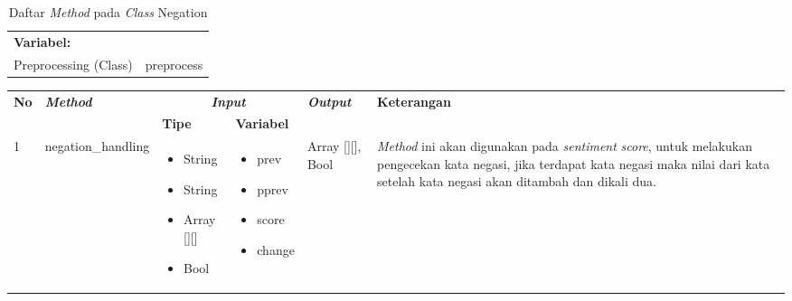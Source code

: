 \begin{table}[H]
	\caption{Daftar \textit{Method} pada \textit{Class} Negation}
	\centering
	\small
	\begin{adjustbox}{width=1\textwidth}	
	\begin{tabular}{|p{4cm} p{9cm}|}
		\hline
		\multicolumn{2}{|l|}{\textbf{Variabel:}}\\
		Preprocessing (Class)&preprocess\\
		\hline
	\end{tabular}
	\end{adjustbox}
\end{table}
\begin{table}[H]
	\centering
	\small
	\begin{adjustbox}{width=1\textwidth}	
	\begin{tabular}{|p{0.4cm}|p{3.2cm}|p{1.4cm}|p{1.7cm}|p{1.20cm}|p{3.35cm}|}
		\hline
		\multirow{2}{*}{\textbf{No}} & \multirow{2}{*}{\textit{\textbf{Method}}} & \multicolumn{2}{c|}{\textit{\textbf{Input}}} & \multirow{2}{*}{\textit{\textbf{Output}}} & 
		\multirow{2}{*}{\textbf{Keterangan}}\\
		\cline{3-4}
		& & \textbf{Tipe} & \textbf{Variabel} & & \\
		\hline
		1 & negation\_handling & \begin{itemize}[leftmargin=*,label={-}]
			\item String
			\item String
			\item Array [][]
			\item Bool\end{itemize}
		& \begin{itemize}[leftmargin=*,label={-}]
			\vspace{-0.5cm}
			\item prev
			\item pprev
			\item score
			\item change\end{itemize}
		& Array [][], Bool & \textit{Method} ini akan digunakan pada \textit{sentiment} \textit{score}, untuk melakukan pengecekan kata negasi, jika terdapat kata negasi maka nilai dari kata setelah kata negasi akan ditambah dan dikali dua. \\
		\hline
	\end{tabular}
	\end{adjustbox}
\end{table}
